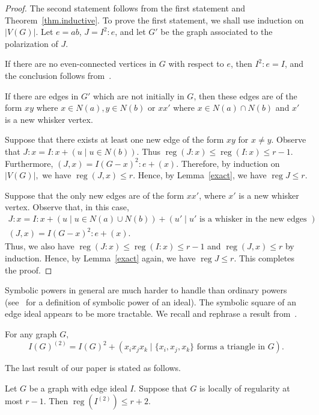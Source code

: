\documentclass[ALCO,ThmDefs,Unicode,epreuves]{cedram}
\DeclareMathOperator{\reg}{reg}
\newcommand*{\reg}{\mathrm{reg}}
\begin{document}
\begin{proof} The second statement follows from the first statement and Theorem~\ref{thm.inductive}. To prove the first statement, we shall use induction on $|V(G)|$. Let $e = ab$, $J = I^2 : e$, and let $G'$ be the graph associated to the polarization of $J$.

If there are no even-connected vertices in $G$ with respect to $e$, then $I^2 : e = I$, and the conclusion follows from~\cite[Proposition 4.9]{CHHKTT}.

If there are edges in $G'$ which are not initially in $G$, then these edges are of the form $xy$ where $x \in N(a), y \in N(b)$ or $xx'$ where $x \in N(a) \cap N(b)$ and $x'$ is a new whisker vertex.

Suppose that there exists at least one new edge of the form $xy$ for $x \not= y$. Observe that $J:x= I:x+(u  \mid  u \in N(b)).$ Thus $\reg (J:x) \leq \reg (I:x) \leq r-1.$ Furthermore, $(J,x)= I(G - x)^2:e+(x).$ Therefore, by induction on $|V(G)|,$ we have $\reg (J,x) \leq r.$ Hence, by Lemma~\ref{exact}, we have $\reg J \leq r$.

Suppose that the only new edges are of the form $xx'$, where $x'$ is a new whisker vertex. Observe that, in this case,
\begin{gather*}
 J:x= I:x +( u  \mid  u \in N(a)\cup N(b))+(u'  \mid  u' \text{ is a whisker in the new edges }) 
\\
(J,x)= I(G - x)^2:e+(x).
\end{gather*}
Thus, we also have $\reg (J:x) \leq \reg (I:x) \leq r-1$ and $\reg (J,x)\leq r$ by induction. Hence, by Lemma~\ref{exact} again, we have $\reg J \leq r.$ This completes the proof.
\end{proof}

Symbolic powers in general are much harder to handle than ordinary powers (see~\cite[Definition 4.3.22]{V} for a definition of symbolic power of an ideal). The symbolic square of an edge ideal appears to be more tractable. We recall and rephrase a result from~\cite{Su}.


\begin{theo} \label{SecondSymb}
For any graph $G,$
\[
 I(G)^{(2)}= I(G)^2+(x_ix_jx_k  \mid  \{x_i,x_j,x_k\} \text{ forms a triangle in } G). 
\]

\end{theo}

The last result of our paper is stated as follows.

\begin{theo}
Let $G$ be a graph with edge ideal $I$. Suppose that $G$ is locally of regularity at most $r-1$. Then $\reg (I^{(2)}) \le r+2.$
\end{theo}
\end{document}
